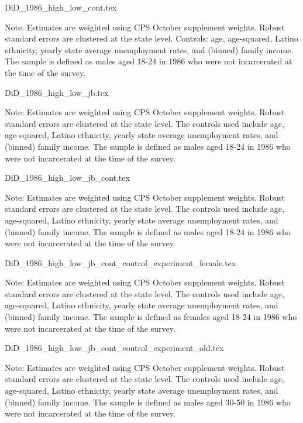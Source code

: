 {DiD_1986_high_low_cont.tex}
\begin{footnotesize}
  \noindent Note: Estimates are weighted using CPS October supplement weights. Robust standard errors are clustered at the state level. Controls: age, age-squared, Latino ethnicity, yearly state average unemployment rates, and (binned) family income. The sample is defined as males aged 18-24 in 1986 who were not incarcerated at the time of the survey.
\end{footnotesize}
\clearpage

{DiD_1986_high_low_jb.tex}
\begin{footnotesize}
  \noindent Note: Estimates are weighted using CPS October supplement weights. Robust standard errors are clustered at the state level. The controls used include age, age-squared, Latino ethnicity, yearly state average unemployment rates, and (binned) family income. The sample is defined as males aged 18-24 in 1986 who were not incarcerated at the time of the survey.
\end{footnotesize}

{DiD_1986_high_low_jb_cont.tex}
\begin{footnotesize}
  \noindent Note: Estimates are weighted using CPS October supplement weights. Robust standard errors are clustered at the state level. The controls used include age, age-squared, Latino ethnicity, yearly state average unemployment rates, and (binned) family income. The sample is defined as males aged 18-24 in 1986 who were not incarcerated at the time of the survey.
\end{footnotesize}
\clearpage

{DiD_1986_high_low_jb_cont_control_experiment_female.tex}
\begin{footnotesize}
  \noindent Note: Estimates are weighted using CPS October supplement weights. Robust standard errors are clustered at the state level. The controls used include age, age-squared, Latino ethnicity, yearly state average unemployment rates, and (binned) family income. The sample is defined as females aged 18-24 in 1986 who were not incarcerated at the time of the survey.
\end{footnotesize}


{DiD_1986_high_low_jb_cont_control_experiment_old.tex}
\begin{footnotesize}
  \noindent Note: Estimates are weighted using CPS October supplement weights. Robust standard errors are clustered at the state level. The controls used include age, age-squared, Latino ethnicity, yearly state average unemployment rates, and (binned) family income. The sample is defined as males aged 30-50 in 1986 who were not incarcerated at the time of the survey.
\end{footnotesize}


